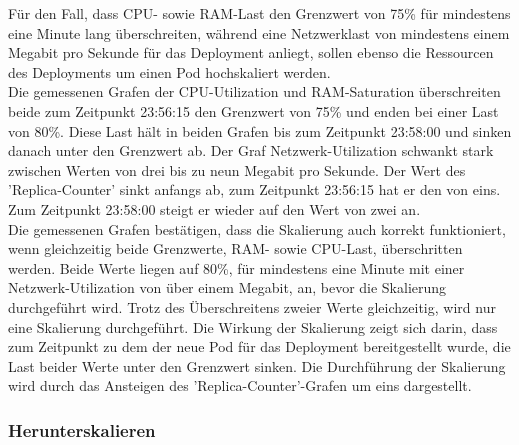 \documentclass[a4paper,10pt]{scrartcl}
\begin{document}
\begin{description}
Für den Fall, dass CPU- sowie RAM-Last den Grenzwert von 75\% für mindestens eine Minute lang überschreiten, während eine Netzwerklast von mindestens einem Megabit pro Sekunde für das Deployment anliegt, sollen ebenso die Ressourcen des Deployments um einen Pod hochskaliert werden.\\
Die gemessenen Grafen der CPU-Utilization und RAM-Saturation überschreiten beide zum Zeitpunkt 23:56:15 den Grenzwert von 75\% und enden bei einer Last von 80\%. Diese Last hält in beiden Grafen bis zum Zeitpunkt 23:58:00 und sinken danach unter den Grenzwert ab.
Der Graf Netzwerk-Utilization schwankt stark zwischen Werten von drei bis zu neun Megabit pro Sekunde. Der Wert des 'Replica-Counter' sinkt anfangs ab, zum Zeitpunkt 23:56:15 hat er den von eins. Zum Zeitpunkt 23:58:00 steigt er wieder auf den Wert von zwei an.\\
Die gemessenen Grafen bestätigen, dass die Skalierung auch korrekt funktioniert, wenn gleichzeitig beide Grenzwerte, RAM- sowie CPU-Last, überschritten werden. Beide Werte liegen auf 80\%, für mindestens eine Minute mit einer Netzwerk-Utilization von über einem Megabit, an, bevor die Skalierung durchgeführt wird. Trotz des Überschreitens zweier Werte gleichzeitig, wird nur eine Skalierung durchgeführt. Die Wirkung der Skalierung zeigt sich darin, dass zum Zeitpunkt zu dem der neue Pod für das Deployment bereitgestellt wurde, die Last beider Werte unter den Grenzwert sinken. Die Durchführung der Skalierung wird durch das Ansteigen des 'Replica-Counter'-Grafen um eins dargestellt.

\end{description}

\pagebreak

\subsubsection{Herunterskalieren}
\end{document}
